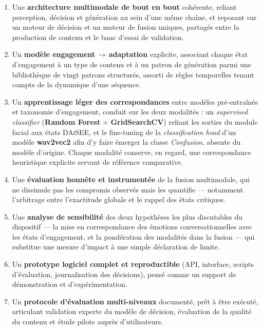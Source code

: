 \begin{enumerate}
  \item Une \textbf{architecture multimodale de bout en bout} cohérente, reliant
  perception, décision et génération au sein d'une même chaîne, et reposant sur
  un moteur de décision et un moteur de fusion uniques, partagés entre la
  production de contenu et le banc d'essai de validation.

  \item Un \textbf{modèle engagement\,$\rightarrow$\,adaptation} explicite,
  associant chaque état d'engagement à un type de contenu et à un patron de
  génération parmi une bibliothèque de vingt patrons structurés, assorti de
  règles temporelles tenant compte de la dynamique d'une séquence.

  \item Un \textbf{apprentissage léger des correspondances} entre modèles
  pré-entraînés et taxonomie d'engagement, conduit sur les deux modalités : un
  \emph{supervised classifier} (\textbf{Random Forest} + \textbf{GridSearchCV}) reliant
  les sorties du module facial aux états \textsc{DAiSEE}, et le fine-tuning de la
  \emph{classification head} d'un modèle \textbf{wav2vec2} afin d'y faire émerger
  la classe \emph{Confusion}, absente du modèle d'origine. Chaque modalité conserve,
  en regard, une correspondance heuristique explicite servant de référence comparative.

  \item Une \textbf{évaluation honnête et instrumentée} de la fusion multimodale,
  qui ne dissimule pas les compromis observés mais les quantifie — notamment
  l'arbitrage entre l'exactitude globale et le rappel des états critiques.

  \item Une \textbf{analyse de sensibilité} des deux hypothèses les plus
  discutables du dispositif — la mise en correspondance des émotions
  conversationnelles avec les états d'engagement, et la pondération des modalités
  dans la fusion — qui substitue une mesure d'impact à une simple déclaration de
  limite.

  \item Un \textbf{prototype logiciel complet et reproductible} (API, interface,
  scripts d'évaluation, journalisation des décisions), pensé comme un support de
  démonstration et d'expérimentation.

  \item Un \textbf{protocole d'évaluation multi-niveaux} documenté, prêt à être
  exécuté, articulant validation experte du modèle de décision, évaluation de la
  qualité du contenu et étude pilote auprès d'utilisateurs.
\end{enumerate}

